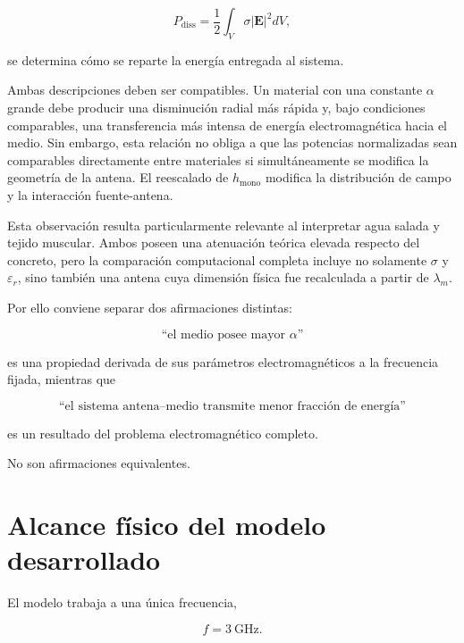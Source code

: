 \begin{equation}
P_{\mathrm{diss}}
=
\frac{1}{2}
\int_V
\sigma|\mathbf{E}|^2dV,
\end{equation}

se determina cómo se reparte la energía entregada al sistema.

Ambas descripciones deben ser compatibles. Un material con una constante $\alpha$ grande debe producir una disminución radial más rápida y, bajo condiciones comparables, una transferencia más intensa de energía electromagnética hacia el medio. Sin embargo, esta relación no obliga a que las potencias normalizadas sean comparables directamente entre materiales si simultáneamente se modifica la geometría de la antena. El reescalado de $h_{\mathrm{mono}}$ modifica la distribución de campo y la interacción fuente-antena.

Esta observación resulta particularmente relevante al interpretar agua salada y tejido muscular. Ambos poseen una atenuación teórica elevada respecto del concreto, pero la comparación computacional completa incluye no solamente $\sigma$ y $\varepsilon_r$, sino también una antena cuya dimensión física fue recalculada a partir de $\lambda_m$.

Por ello conviene separar dos afirmaciones distintas:

\begin{equation}
\text{``el medio posee mayor }\alpha\text{''}
\end{equation}

es una propiedad derivada de sus parámetros electromagnéticos a la frecuencia fijada, mientras que

\begin{equation}
\text{``el sistema antena--medio transmite menor fracción de energía''}
\end{equation}

es un resultado del problema electromagnético completo.

No son afirmaciones equivalentes.

\section{Alcance físico del modelo desarrollado}

El modelo trabaja a una única frecuencia,

\begin{equation}
f=3~\mathrm{GHz}.
\end{equation}

